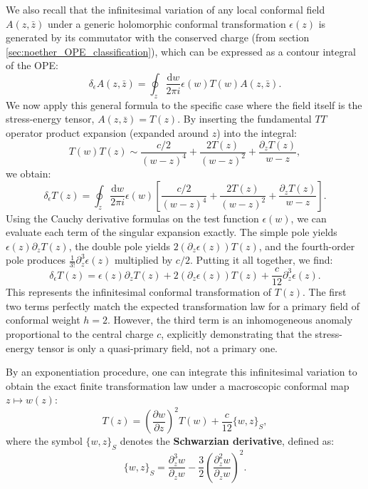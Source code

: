 We also recall that the infinitesimal variation of any local conformal field \(A(z, \bar{z})\) under a generic holomorphic conformal transformation \(\epsilon(z)\) is generated by its commutator with the conserved charge (from section \ref{sec:noether_OPE_classification}), which can be expressed as a contour integral of the OPE:
\[
    \delta_\epsilon A(z, \bar{z}) = \oint_z \frac{\mathrm{d} w}{2\pi i} \epsilon(w) T(w) A(z, \bar{z}).
\]
We now apply this general formula to the specific case where the field itself is the stress-energy tensor, \(A(z, \bar{z}) = T(z)\). By inserting the fundamental \(TT\) operator product expansion (expanded around \(z\)) into the integral:
\[
    T(w)T(z) \sim \frac{c/2}{(w - z)^4} + \frac{2T(z)}{(w - z)^2} + \frac{\partial_z T(z)}{w - z},
\]
we obtain:
\[
    \delta_\epsilon T(z) = \oint_z \frac{\mathrm{d} w}{2\pi i} \epsilon(w) \left[ \frac{c/2}{(w - z)^4} + \frac{2T(z)}{(w - z)^2} + \frac{\partial_z T(z)}{w - z} \right].
\]
Using the Cauchy derivative formulas on the test function \(\epsilon(w)\), we can evaluate each term of the singular expansion exactly. The simple pole yields \(\epsilon(z) \partial_z T(z)\), the double pole yields \(2 (\partial_z \epsilon(z)) T(z)\), and the fourth-order pole produces \(\frac{1}{3!} \partial_z^3 \epsilon(z)\) multiplied by \(c/2\). Putting it all together, we find:
\[
    \delta_\epsilon T(z) = \epsilon(z)\partial_z T(z) + 2(\partial_z \epsilon(z))T(z) + \frac{c}{12}\partial_z^3 \epsilon(z).
\]
This represents the infinitesimal conformal transformation of \(T(z)\). The first two terms perfectly match the expected transformation law for a primary field of conformal weight \(h = 2\). However, the third term is an inhomogeneous anomaly proportional to the central charge \(c\), explicitly demonstrating that the stress-energy tensor is only a quasi-primary field, not a primary one.

By an exponentiation procedure, one can integrate this infinitesimal variation to obtain the exact finite transformation law under a macroscopic conformal map \(z \mapsto w(z)\):
\[
    T(z) = \left(\frac{\partial w}{\partial z}\right)^2 T(w) + \frac{c}{12} \{w, z\}_S,
\]
where the symbol \(\{w, z\}_S\) denotes the \textbf{Schwarzian derivative}, defined as:
\[
    \{w, z\}_S = \frac{\partial_z^3 w}{\partial_z w} - \frac{3}{2} \left( \frac{\partial_z^2 w}{\partial_z w} \right)^2.
\]

